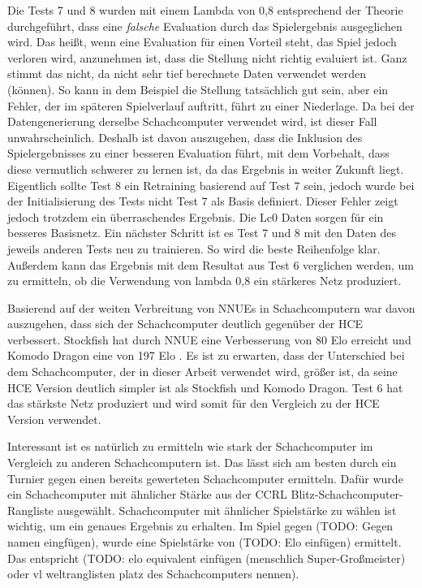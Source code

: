 Die Tests 7 und 8 wurden mit einem Lambda von 0,8 entsprechend der Theorie durchgeführt, dass eine \emph{falsche} Evaluation durch das Spielergebnis ausgeglichen wird. Das heißt, wenn eine Evaluation für einen Vorteil steht, das Spiel jedoch verloren wird, anzunehmen ist, dass die Stellung nicht richtig evaluiert ist. Ganz stimmt das nicht, da nicht sehr tief berechnete Daten verwendet werden (können). So kann in dem Beispiel die Stellung tatsächlich gut sein, aber ein Fehler, der im späteren Spielverlauf auftritt, führt zu einer Niederlage. Da bei der Datengenerierung derselbe Schachcomputer verwendet wird, ist dieser Fall unwahrscheinlich. Deshalb ist davon auszugehen, dass die Inklusion des Spielergebnisses zu einer besseren Evaluation führt, mit dem Vorbehalt, dass diese vermutlich schwerer zu lernen ist, da das Ergebnis in weiter Zukunft liegt. Eigentlich sollte Test 8 ein Retraining basierend auf Test 7 sein, jedoch wurde bei der Initialisierung des Tests nicht Test 7 als Basis definiert. Dieser Fehler zeigt jedoch trotzdem ein überraschendes Ergebnis. Die \ac{Lc0} Daten sorgen für ein besseres Basisnetz. Ein nächster Schritt ist es Test 7 und 8 mit den Daten des jeweils anderen Tests neu zu trainieren. So wird die beste Reihenfolge klar. Außerdem kann das Ergebnis mit dem Resultat aus Test 6 verglichen werden, um zu ermitteln, ob die Verwendung von lambda 0,8 ein stärkeres Netz produziert.

Basierend auf der weiten Verbreitung von \acp{NNUE} in Schachcomputern war davon auszugehen, dass sich der Schachcomputer deutlich gegenüber der \ac{HCE} verbessert. Stockfish hat durch \ac{NNUE} eine Verbesserung von 80 Elo erreicht und Komodo Dragon eine von 197 Elo \cite{StockfishIntroducingNNUE, KomodoDragon}. Es ist zu erwarten, dass der Unterschied bei dem Schachcomputer, der in dieser Arbeit verwendet wird, größer ist, da seine \ac{HCE} Version deutlich simpler ist als Stockfish und Komodo Dragon. Test 6 hat das stärkste Netz produziert und wird somit für den Vergleich zu der \ac{HCE} Version verwendet.

Interessant ist es natürlich zu ermitteln wie stark der Schachcomputer im Vergleich zu anderen Schachcomputern ist. Das lässt sich am besten durch ein Turnier gegen einen bereits gewerteten Schachcomputer ermitteln. Dafür wurde ein Schachcomputer mit ähnlicher Stärke aus der \ac{CCRL} \cite{CCRL} Blitz-Schachcomputer-Rangliste ausgewählt. Schachcomputer mit ähnlicher Spielstärke zu wählen ist wichtig, um ein genaues Ergebnis zu erhalten. Im Spiel gegen (TODO: Gegen namen eingfügen), wurde eine Spielstärke von (TODO: Elo einfügen) ermittelt. Das entspricht (TODO: elo equivalent einfügen (menschlich \zb{} Super-Großmeister) oder vl weltranglisten platz des Schachcomputers nennen).

